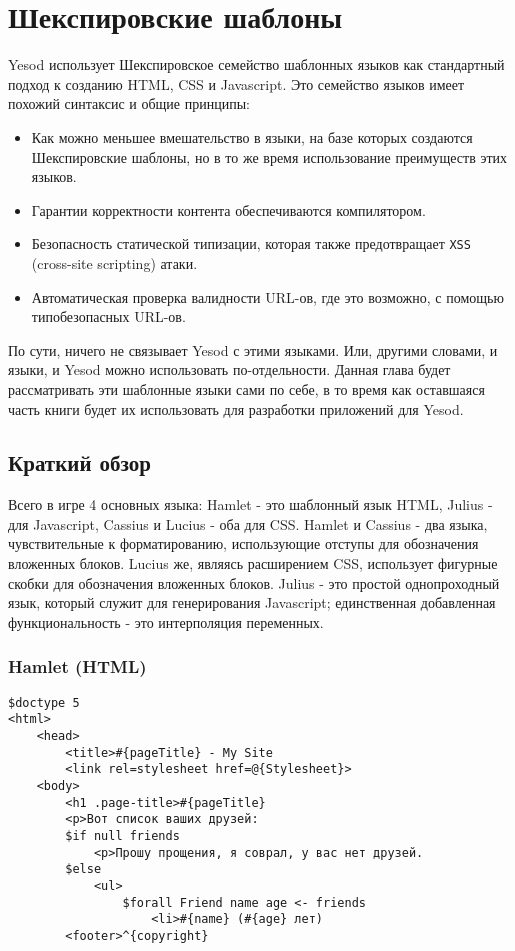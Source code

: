 \chapter{Шекспировские шаблоны}\label{chap:shakespeare}

Yesod использует Шекспировское семейство шаблонных языков как стандартный 
подход к созданию HTML, CSS и Javascript. Это семейство языков имеет похожий 
синтаксис и общие принципы: 

\begin{itemize}
\item Как можно меньшее вмешательство в языки, на базе которых создаются
Шекспировские шаблоны, но в то же время использование преимуществ этих языков.
\item Гарантии корректности контента обеспечиваются компилятором.
\item Безопасность статической типизации, которая также 
предотвращает \texttt{XSS} (cross-site scripting) атаки.
\item Автоматическая проверка валидности URL-ов, где это возможно, с помощью 
типобезопасных URL-ов.
\end{itemize}

По сути, ничего не связывает Yesod с этими языками. Или, другими словами, и языки, 
и Yesod можно использовать по-отдельности. Данная глава будет рассматривать 
эти шаблонные языки сами по себе, в то время как оставшаяся часть книги 
будет их использовать для разработки приложений для Yesod.

\section{Краткий обзор}

Всего в игре 4 основных языка: Hamlet - это шаблонный язык HTML, 
Julius - для Javascript, Cassius и Lucius - оба для CSS. Hamlet и Cassius - 
два языка, чувствительные к форматированию, использующие отступы для 
обозначения вложенных блоков. Lucius же, являясь расширением CSS, использует
фигурные скобки для обозначения вложенных блоков. 
Julius - это простой однопроходный язык, который служит для 
генерирования Javascript; единственная добавленная функциональность - это 
интерполяция переменных.

\subsection{Hamlet (HTML)}

\begin{lstlisting}
$doctype 5
<html>
    <head>
        <title>#{pageTitle} - My Site
        <link rel=stylesheet href=@{Stylesheet}>
    <body>
        <h1 .page-title>#{pageTitle}
        <p>Вот список ваших друзей:
        $if null friends
            <p>Прошу прощения, я соврал, у вас нет друзей.
        $else
            <ul>
                $forall Friend name age <- friends
                    <li>#{name} (#{age} лет)
        <footer>^{copyright}
\end{lstlisting}

